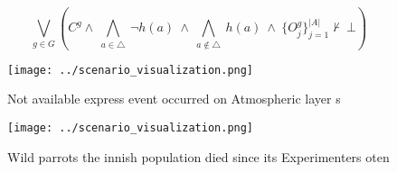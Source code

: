 \documentclass[a4paper]{article}
\begin{document}
\[\bigvee_{g\in G} (C^g \wedge\ \bigwedge_{a\in \triangle}\ \neg h(a)\ \wedge\ \bigwedge_{a\notin \triangle}\ h(a)\ \wedge\ \{O_j^g\}_{j=1}^{|A|} \nvdash\ \bot )\]

\begin{figure}
\centering
\texttt{[image: ../scenario\_visualization.png]}
\caption{Not available express event occurred on Atmospheric layer s
}
\end{figure}
 
\begin{figure}
\centering
\texttt{[image: ../scenario\_visualization.png]}
\caption{Wild parrots the innish population died since its Experimenters oten 
}
\end{figure}
 
\end{document}

